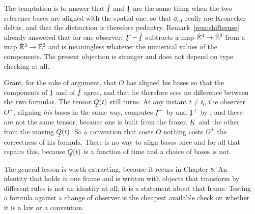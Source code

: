 \begin{remark}\label{rem:ch7shiftertrap}
The temptation is to answer that $\hI$ and $\shift$ are the same thing
when the two reference bases are aligned with the spatial one, so that
$\dd_{iA}$ really are Kronecker deltas, and that the distinction is
therefore pedantry. Remark~\ref{rem:shifteruse} already answered that for
one observer: $\bF-\hI$ subtracts a map $\hat{\mathbb{E}}^{3}\to\hat{\mathbb{E}}^{3}$ from a map
$\hat{\mathbb{E}}^{3}\to\mathbb{E}^{3}$ and is meaningless whatever the numerical values of the
components. The present objection is stronger and does not depend on
type checking at all.

Grant, for the sake of argument, that $O$ has aligned his bases so that
the components of $\shift$ and of $\hI$ agree, and that he therefore sees
no difference between the two formulas. The tensor $\bQ(t)$ still turns.
At any instant $t\neq t_{0}$ the observer $O^{+}$, aligning \emph{his}
bases in the same way, computes $\hI^{+}$ by  and
$\shift^{+}$ by , and these are not the same tensor, because
one is built from the frozen $\bK$ and the other from the moving
$\bQ(t)$. So a convention that costs $O$ nothing costs $O^{+}$ the
correctness of his formula. There is no way to align bases once and for
all that repairs this, because $\bQ(t)$ is a function of time and a
choice of bases is not.

The general lesson is worth extracting, because it recurs in Chapter 8.
An identity that holds in one frame and is written with objects that
transform by different rules is not an identity at all; it is a statement
about that frame. Testing a formula against a change of observer is the
cheapest available check on whether it is a law or a convention.
\end{remark}

